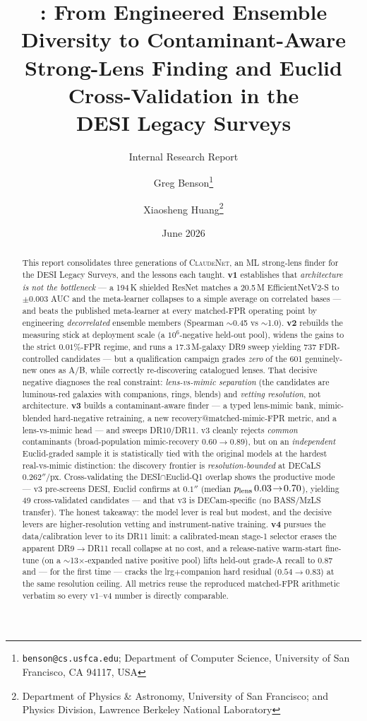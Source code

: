\documentclass[11pt,letterpaper]{article}
\title{\cnet{}: From Engineered Ensemble Diversity to Contaminant-Aware\\
       Strong-Lens Finding and Euclid Cross-Validation in the\\
       DESI Legacy Surveys}
\author{Greg Benson\thanks{\texttt{benson@cs.usfca.edu}; Department of Computer
        Science, University of San Francisco, CA 94117, USA} \and
        Xiaosheng Huang\thanks{Department of Physics \& Astronomy, University of
        San Francisco; and Physics Division, Lawrence Berkeley National Laboratory}}
\date{June 2026}
\newcommand{\cnet}{\textsc{ClaudeNet}}
\begin{document}
\maketitle
\subtitle{Internal Research Report}

\begin{abstract}
This report consolidates three generations of \cnet{}, an ML strong-lens finder for the DESI
Legacy Surveys, and the lessons each taught. \textbf{v1} establishes that \emph{architecture is not
the bottleneck} --- a 194\,K shielded ResNet matches a 20.5\,M EfficientNetV2-S to $\pm0.003$ AUC
and the \citet{inchausti2025} meta-learner collapses to a simple average on correlated bases --- and
beats the published meta-learner at every matched-FPR operating point by engineering
\emph{decorrelated} ensemble members (Spearman $\sim$0.45 vs $\sim$1.0). \textbf{v2} rebuilds the
measuring stick at deployment scale (a $10^6$-negative held-out pool), widens the gains to the
strict $0.01\%$-FPR regime, and runs a $17.3$\,M-galaxy DR9 sweep yielding 737 FDR-controlled
candidates --- but a qualification campaign grades \emph{zero} of the 601 genuinely-new ones as
A/B, while correctly re-discovering catalogued lenses. That decisive negative diagnoses the real
constraint: \emph{lens-vs-mimic separation} (the candidates are luminous-red galaxies with
companions, rings, blends) and \emph{vetting resolution}, not architecture. \textbf{v3} builds a
contaminant-aware finder --- a typed lens-mimic bank, mimic-blended hard-negative retraining, a new
recovery@matched-mimic-FPR metric, and a lens-vs-mimic head --- and sweeps DR10/DR11. v3 cleanly
rejects \emph{common} contaminants (broad-population mimic-recovery $0.60\!\to\!0.89$), but on an
\emph{independent} Euclid-graded sample it is statistically tied with the original models at the
hardest real-vs-mimic distinction: the discovery frontier is \emph{resolution-bounded} at DECaLS
$0.262''$/px. Cross-validating the DESI$\cap$Euclid-Q1 overlap shows the productive mode --- v3
pre-screens DESI, Euclid confirms at $0.1''$ (median $p_{\rm lens}\,0.03\!\to\!0.70$), yielding 49
cross-validated candidates --- and that v3 is DECam-specific (no BASS/MzLS transfer). The honest
takeaway: the model lever is real but modest, and the decisive levers are higher-resolution vetting
and instrument-native training. \textbf{v4} pursues the data/calibration lever to its DR11 limit: a
calibrated-mean stage-1 selector erases the apparent DR9$\to$DR11 recall collapse at no cost, and a
release-native warm-start fine-tune (on a $\sim$13$\times$-expanded native positive pool) lifts
held-out grade-A recall to $0.87$ and --- for the first time --- cracks the lrg$+$companion hard
residual ($0.54\!\to\!0.83$) at the same resolution ceiling. All metrics reuse the reproduced
matched-FPR arithmetic verbatim so every v1--v4 number is directly comparable.
\end{abstract}
\end{document}
